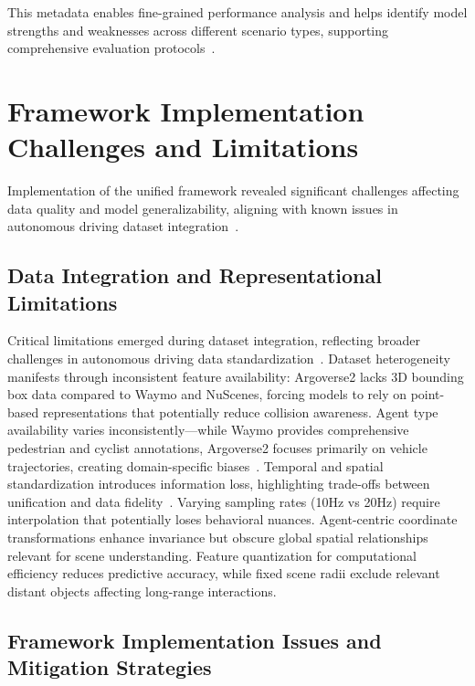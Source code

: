 This metadata enables fine-grained performance analysis and helps identify model strengths and weaknesses across different scenario types, supporting comprehensive evaluation protocols~\cite{unitrajFeng2024}.

\section{Framework Implementation Challenges and Limitations}
\label{sec:data_challenges}

Implementation of the unified framework revealed significant challenges affecting data quality and model generalizability, aligning with known issues in autonomous driving dataset integration~\cite{metadriveLi2022, scenarionetLi2023}.

\subsection{Data Integration and Representational Limitations}
\label{ssec:data_limitations}

Critical limitations emerged during dataset integration, reflecting broader challenges in autonomous driving data standardization~\cite{hu2023planning}. Dataset heterogeneity manifests through inconsistent feature availability: Argoverse2 lacks 3D bounding box data compared to Waymo and NuScenes, forcing models to rely on point-based representations that potentially reduce collision awareness. Agent type availability varies inconsistently—while Waymo provides comprehensive pedestrian and cyclist annotations, Argoverse2 focuses primarily on vehicle trajectories, creating domain-specific biases~\cite{unitrajFeng2024}.
Temporal and spatial standardization introduces information loss, highlighting trade-offs between unification and data fidelity~\cite{bronstein2021geometric}. Varying sampling rates (10Hz vs 20Hz) require interpolation that potentially loses behavioral nuances. Agent-centric coordinate transformations enhance invariance but obscure global spatial relationships relevant for scene understanding. Feature quantization for computational efficiency reduces predictive accuracy, while fixed scene radii exclude relevant distant objects affecting long-range interactions.

\subsection{Framework Implementation Issues and Mitigation Strategies}
\label{ssec:framework_issues}

